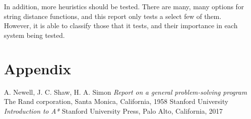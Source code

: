 \documentclass{article}
\begin{document}
In addition, more heuristics should be tested. 
There are many, many options for string distance functions, and this report only tests a select few of them.
However, it is able to classify those that it tests, and their importance in each system being tested.

\section{Appendix}

\begin{thebibliography}{9}
        A. Newell, J. C. Shaw, H. A. Simon
        \textit{Report on a general problem-solving program}
        The Rand corporation, Santa Monica, California, 1958
        Stanford University
        \textit{Introduction to A*}
        Stanford University Press, Palo Alto, California, 2017
\end{thebibliography}
\end{document}
